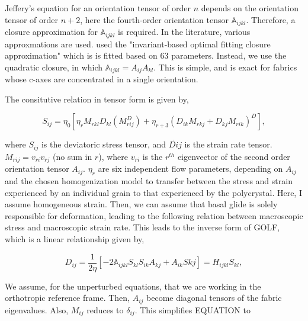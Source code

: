 \documentclass{report}
\begin{document}
Jeffery's equation for an orientation tensor of order $n$ depends on the orientation tensor of order $n+2$, here the fourth-order orientation tensor $\mathbb{A}_{ijkl}$. Therefore, a closure approximation for $\mathbb{A}_{ijkl}$ is required. In the literature, various approxmations are used. \citet{gillet-chaulet2006} used the "invariant-based optimal fitting closure approximation" which is is fitted based on 63 parameters. Instead, we use the quadratic closure, in which $\mathbb{A}_{ijkl} = A_{ij} A_{kl}$. This is simple, and is exact for fabrics whose c-axes are concentrated in a single orientation. 

The consitutive relation in tensor form is given by,

\begin{equation}
S_{ij} = \eta_0 \left[ \eta_r M_{rkl} D_{kl} \left( M_{rij}^D \right)  + \eta_{r+3} \left( D_{ik} M_{rkj} + D_{kj} M_{rik} \right)^D \right],
\end{equation}

where $S_{ij}$ is the deviatoric stress tensor, and $\dot{D{ij}}$ is the strain rate tensor. $M_{rij} = v_{ri} v_{rj}$ (no sum in $r$), where $v_{ri}$ is the $r^{th}$ eigenvector of the second order orientation tensor $A_{ij}$. $\eta_r$ are six independent flow parameters, depending on $A_{ij}$ and the chosen homogenization model to transfer between the stress and strain experienced by an individual grain to that experienced by the polycrystal. Here, I assume homogeneous strain. Then, we can assume that basal glide is solely responsible for deformation, leading to the following relation between macroscopic stress and macroscopic strain rate. This leads to the inverse form of GOLF, which is a linear relationship given by,

\begin{equation}
   D_{ij} = \frac{1}{2 \eta} \left[ -2 \mathbb{A}_{ijkl}S_{kl}  S_{ik}A_{kj} + A_{ik}S{kj} \right] = H_{ijkl} S_{kl},
\end{equation}

We assume, for the unperturbed equations, that we are working in the orthotropic reference frame. Then, $A_{ij}$ become diagonal tensors of the fabric eigenvalues. Also, $M_{ij}$ reduces to $\delta_{ij}$. This simplifies EQUATION to 
\end{document}
